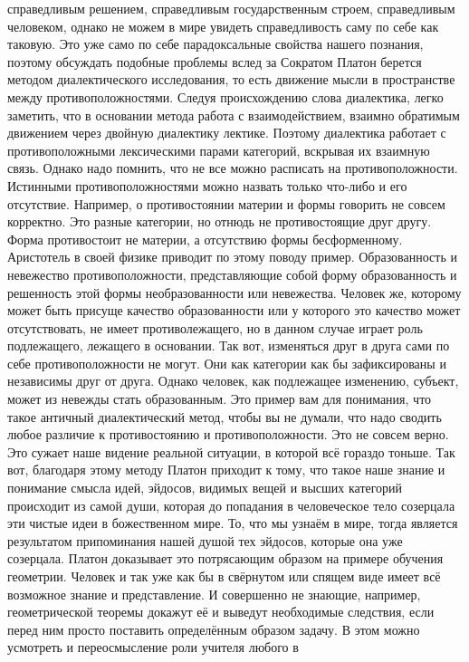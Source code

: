 справедливым решением, справедливым государственным строем, справедливым
человеком, однако не можем в мире увидеть справедливость саму по себе как
таковую. Это уже само по себе парадоксальные свойства нашего познания, поэтому
обсуждать подобные проблемы вслед за Сократом Платон берется методом
диалектического исследования, то есть движение мысли в пространстве между
противоположностями. Следуя происхождению слова диалектика, легко заметить, что
в основании метода работа с взаимодействием, взаимно обратимым движением через
двойную диалектику лектике. Поэтому диалектика работает с противоположными
лексическими парами категорий, вскрывая их взаимную связь. Однако надо помнить,
что не все можно расписать на противоположности. Истинными противоположностями
можно назвать только что-либо и его отсутствие. Например, о противостоянии
материи и формы говорить не совсем корректно. Это разные категории, но отнюдь не
противостоящие друг другу. Форма противостоит не материи, а отсутствию формы
бесформенному. Аристотель в своей физике приводит по этому поводу пример.
Образованность и невежество противоположности, представляющие собой форму
образованность и решенность этой формы необразованности или невежества. Человек
же, которому может быть присуще качество образованности или у которого это
качество может отсутствовать, не имеет противолежащего, но в данном случае
играет роль подлежащего, лежащего в основании. Так вот, изменяться друг в друга
сами по себе противоположности не могут. Они как категории как бы зафиксированы
и независимы друг от друга. Однако человек, как подлежащее изменению, субъект,
может из невежды стать образованным. Это пример вам для понимания, что такое
античный диалектический метод, чтобы вы не думали, что надо сводить любое
различие к противостоянию и противоположности. Это не совсем верно. Это сужает
наше видение реальной ситуации, в которой всё гораздо тоньше. Так вот, благодаря
этому методу Платон приходит к тому, что такое наше знание и понимание смысла
идей, эйдосов, видимых вещей и высших категорий происходит из самой души,
которая до попадания в человеческое тело созерцала эти чистые идеи в
божественном мире. То, что мы узнаём в мире, тогда является результатом
припоминания нашей душой тех эйдосов, которые она уже созерцала. Платон
доказывает это потрясающим образом на примере обучения геометрии. Человек и так
уже как бы в свёрнутом или спящем виде имеет всё возможное знание и
представление. И совершенно не знающие, например, геометрической теоремы докажут
её и выведут необходимые следствия, если перед ним просто поставить определённым
образом задачу. В этом можно усмотреть и переосмысление роли учителя любого в

